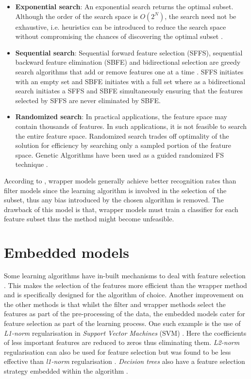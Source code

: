 \begin{itemize}
  \item\textbf{Exponential search}: An exponential search returns the optimal subset. Although the order of the search space is $O(2^N)$, the search need not be exhaustive, i.e. heuristics can be introduced to reduce the search space without compromising the chances of discovering the optimal subset \citep{liu2005toward}.
  \item\textbf{Sequential search}: Sequential forward feature selection (SFFS), sequential backward feature elimination (SBFE) and bidirectional selection are greedy search algorithms that add or remove features one at a time \citep{liu2005toward}. SFFS initiates with an empty set and SBFE initiates with a full set where as a bidirectional search initiates a SFFS and SBFE simultaneously ensuring that the features selected by SFFS are never eliminated by SBFE.
  \item\textbf{Randomized search}: In practical applications, the feature space may contain thousands of features. In such applications, it is not feasible to search the entire feature space. Randomized search trades off optimality of the solution for efficiency by searching only a sampled portion of the feature space. Genetic Algorithms have been used as a guided randomized FS technique \citep{cherkauer1996growing, vafaie1995genetic}.
\end{itemize}

According to \citet{sammut2017encyclopedia}, wrapper models generally achieve better recognition rates than filter models since the learning algorithm is involved in the selection of the subset, thus any bias introduced by the chosen algorithm is removed. The drawback of this model is that, wrapper models must train a classifier for each feature subset thus the method might become unfeasible.

\section{Embedded models}\label{sec:fs_filter}
Some learning algorithms have in-built mechanisms to deal with feature selection \citep{guyon2003introduction,sammut2017encyclopedia}. This makes the selection of the features more efficient than the wrapper method and is specifically designed for the algorithm of choice. Another improvement on the other methods is that whilst the filter and wrapper methods select the features as part of the pre-processing of the data, the embedded models cater for feature selection as part of the learning process. One such example is the use of \textit{L1-norm} regularisation in \textit{Support Vector Machines} (SVM) \citep{guyon2003introduction,de2015feature}. Here the coefficients of less important features are reduced to zeros thus eliminating them. \textit{L2-norm} regularisation can also be used for feature selection but was found to be less effective than \textit{l1-norm} regularisation \citep{de2015feature}. \textit{Decision trees} also have a feature selection strategy embedded within the algorithm \citep{garcia2015data}.

